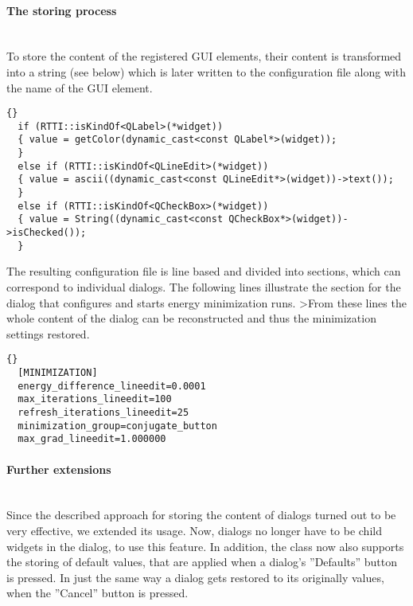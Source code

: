 \paragraph{The storing process}
\hspace*{\fill}\\
To store the content of the registered GUI elements, their content is 
transformed into a string (see below) which is later written to the 
configuration file along with the name of the GUI element.

\begin{lstlisting}{}
  if (RTTI::isKindOf<QLabel>(*widget))
  { value = getColor(dynamic_cast<const QLabel*>(widget));
  }
  else if (RTTI::isKindOf<QLineEdit>(*widget))
  { value = ascii((dynamic_cast<const QLineEdit*>(widget))->text());
  }
  else if (RTTI::isKindOf<QCheckBox>(*widget))
  { value = String((dynamic_cast<const QCheckBox*>(widget))->isChecked());
  }
\end{lstlisting}

The resulting configuration file is line based and divided into sections,
which can correspond to individual dialogs. The following lines illustrate
the section for the dialog that configures and starts energy minimization runs.
>From these lines the whole content of the dialog can be reconstructed and thus 
the minimization settings restored.

\begin{lstlisting}{}
  [MINIMIZATION]
  energy_difference_lineedit=0.0001
  max_iterations_lineedit=100
  refresh_iterations_lineedit=25
  minimization_group=conjugate_button
  max_grad_lineedit=1.000000
\end{lstlisting}

\paragraph{Further extensions}
\hspace*{\fill}\\
Since the described approach for storing the content of dialogs turned out to 
be very effective, we extended its usage. Now, dialogs no longer have to be 
child widgets in the  dialog, to use this feature.
In addition, the  class now also supports the storing 
of default values, that are applied when a dialog's ''Defaults'' button is 
pressed. In just the same way a dialog gets restored to its originally values, 
when the ''Cancel'' button is pressed.

